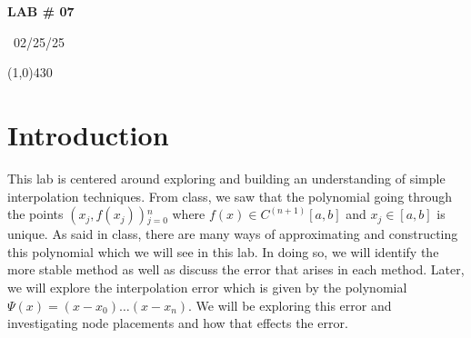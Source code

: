 \documentclass{article}
\begin{document}
\begin{center}
 \LARGE\bfseries LAB \# 07
\end{center}
\begin{center}
    ~02/25/25~
\end{center}
 \line(1,0){430}

\section{Introduction}
This lab is centered around exploring and building an understanding of simple interpolation techniques. From class, we saw that the polynomial going through the points {\((x_j,f(x_j))\)}\(_{j=0}^n\) where \(f(x) \in C^{(n+1)}[a,b]\) and \(x_j \in [a,b]\) is unique. As said in class, there are many ways of approximating and constructing this polynomial which we will see in this lab. In doing so, we will identify the more stable method as well as discuss the error that arises in each method. Later, we will explore the interpolation error which is given by the polynomial \(\Psi(x) = (x-x_0)\dots(x-x_n)\). We will be exploring this error and investigating node placements and how that effects the error.
\end{document}
